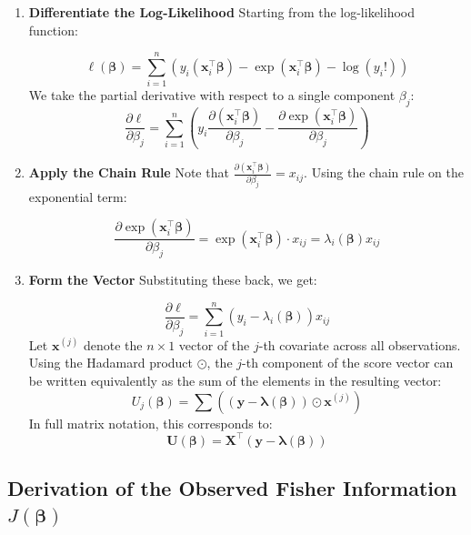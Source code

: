 \documentclass[
  letterpaper,
  DIV=11,
  numbers=noendperiod]{scrreprt}
\renewcommand{\[}{\begin{equation}}
\renewcommand{\]}{\end{equation}}
\theoremstyle{definition}
\theoremstyle{plain}
\theoremstyle{plain}
\theoremstyle{plain}
\theoremstyle{definition}
\theoremstyle{plain}
\theoremstyle{remark}
\begin{document}
\begin{enumerate}
\def\labelenumi{\arabic{enumi}.}
\item
  \textbf{Differentiate the Log-Likelihood} Starting from the
  log-likelihood function:

  \[
  \ell(\boldsymbol{\beta}) = \sum_{i=1}^n \left( y_i (\mathbf{x}_i^\top \boldsymbol{\beta}) - \exp(\mathbf{x}_i^\top \boldsymbol{\beta}) - \log(y_i!) \right)
  \] We take the partial derivative with respect to a single component
  \(\beta_j\): \[
  \frac{\partial \ell}{\partial \beta_j} = \sum_{i=1}^n \left( y_i \frac{\partial (\mathbf{x}_i^\top \boldsymbol{\beta})}{\partial \beta_j} - \frac{\partial \exp(\mathbf{x}_i^\top \boldsymbol{\beta})}{\partial \beta_j} \right)
  \]
\item
  \textbf{Apply the Chain Rule} Note that
  \(\frac{\partial (\mathbf{x}_i^\top \boldsymbol{\beta})}{\partial \beta_j} = x_{ij}\).
  Using the chain rule on the exponential term:

  \[
  \frac{\partial \exp(\mathbf{x}_i^\top \boldsymbol{\beta})}{\partial \beta_j} = \exp(\mathbf{x}_i^\top \boldsymbol{\beta}) \cdot x_{ij} = \lambda_i(\boldsymbol{\beta}) x_{ij}
  \]
\item
  \textbf{Form the Vector} Substituting these back, we get:

  \[
  \frac{\partial \ell}{\partial \beta_j} = \sum_{i=1}^n (y_i - \lambda_i(\boldsymbol{\beta})) x_{ij}
  \] Let \(\mathbf{x}^{(j)}\) denote the \(n \times 1\) vector of the
  \(j\)-th covariate across all observations. Using the Hadamard product
  \(\odot\), the \(j\)-th component of the score vector can be written
  equivalently as the sum of the elements in the resulting vector: \[
  U_j(\boldsymbol{\beta}) = \sum \left( (\mathbf{y} - \boldsymbol{\lambda}(\boldsymbol{\beta})) \odot \mathbf{x}^{(j)} \right)
  \] In full matrix notation, this corresponds to: \[
  \mathbf{U}(\boldsymbol{\beta}) = \mathbf{X}^\top (\mathbf{y} - \boldsymbol{\lambda}(\boldsymbol{\beta}))
  \]
\end{enumerate}

\subsection{\texorpdfstring{Derivation of the Observed Fisher
Information
\(J(\boldsymbol{\beta})\)}{Derivation of the Observed Fisher Information J(\textbackslash boldsymbol\{\textbackslash beta\})}}\label{derivation-of-the-observed-fisher-information-jboldsymbolbeta}
\end{document}
